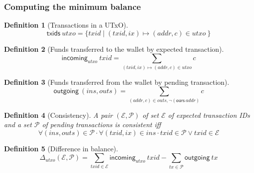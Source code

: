 \documentclass{article}
\newtheorem{definition}{Definition}
\begin{document}
\subsubsection{Computing the minimum balance}

\begin{definition}[Transactions in a UTxO]
\begin{equation*}
  \mathsf{txids} ~ \mathit{utxo}
= \{ \mathit{txid} \mid (\mathit{txid}, \mathit{ix}) \mapsto (\mathit{addr}, c) \in \mathit{utxo} \ \}
\end{equation*}
\end{definition}

\begin{definition}[Funds transferred to the wallet by expected transaction]
\begin{equation*}
  \mathsf{incoming}_\mathit{utxo} ~ \mathit{txid}
= \sum_{(\mathit{txid}, \mathit{ix}) \mapsto (\mathit{addr}, c) \in \mathit{utxo}} c
\end{equation*}
\end{definition}

\begin{definition}[Funds transferred from the wallet by pending transaction]
\begin{equation*}
  \mathsf{outgoing} ~ (\mathit{ins}, \mathit{outs})
= \sum_{(\mathit{addr}, c) \in \mathit{outs}, \neg (\mathsf{ours} ~ \mathit{addr})} c
\end{equation*}
\end{definition}

\begin{definition}[Consistency]
A pair $(\mathcal{E}, \mathcal{P})$ of set $\mathcal{E}$ of expected transaction
IDs and a set $\mathcal{P}$ of pending transactions is \emph{consistent} iff
\begin{equation*}
\forall (\mathit{ins}, \mathit{outs}) \in \mathcal{P} \cdot
\forall (\mathit{txid}, \mathit{ix}) \in \mathit{ins} \cdot
\mathit{txid} \in \mathcal{P} \vee \mathit{txid} \in \mathcal{E}
\end{equation*}
\end{definition}

\begin{definition}[Difference in balance]
\begin{equation*}
  \Delta_\mathit{utxo}(\mathcal{E}, \mathcal{P})
= \sum_{\mathit{txid} \in \mathcal{E}} \mathsf{incoming}_\mathit{utxo} ~ \mathit{txid}
- \sum_{\mathit{tx} \in \mathcal{P}} \mathsf{outgoing} ~ \mathit{tx}
\end{equation*}
\end{definition}
\end{document}
